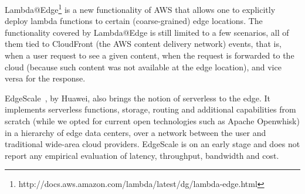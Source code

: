 Lambda@Edge\footnote{http://docs.aws.amazon.com/lambda/latest/dg/lambda-edge.html} is a new functionality of AWS that allows one to explicitly deploy lambda functions to certain (coarse-grained) edge locations. The functionality covered by Lambda@Edge is still limited to a few scenarios, all of them tied to CloudFront (the AWS content delivery network) events, that is, when a user request to see a given content, when the request is forwarded to the cloud (because such content was not available at the edge location), and vice versa for the response.

EdgeScale~\cite{Lara2016hierarchical}, by Huawei, also brings the notion of serverless to the edge. It implements serverless functions, storage, routing and additional capabilities from scratch (while we opted for current open technologies such as Apache Openwhisk) in a hierarchy of edge data centers, over a network between the user and traditional wide-area cloud providers. EdgeScale is on an early stage and does not report any empirical evaluation of latency, throughput, bandwidth and cost.

%










